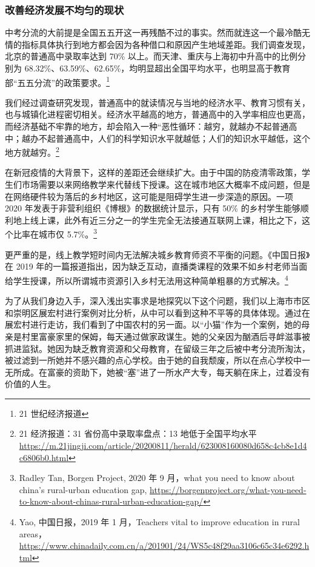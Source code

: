 \documentclass[12pt,UTF8]{ctexart}
\begin{document}
\subsubsection {改善经济发展不均匀的现状}
\par{中考分流的大前提是全国五五开这一再残酷不过的事实。然而就连这一个最冷酷无情的指标具体执行到地方都会因为各种借口和原因产生地域差距。我们调查发现，北京的普通高中录取率达到
	70\% 以上。而天津、重庆与上海初中升高中的比例分别为
	68.32\%、63.59\%、62.65\%，均明显超出全国平均水平，也明显高于教育部“五五分流”的政策要求。\footnote{21 世纪经济报道}}
\par{我们经过调查研究发现，普通高中的就读情况与当地的经济水平、教育习惯有关，也与城镇化进程密切相关。经济水平越高的地方，普通高中的入学率相应也更高，而经济基础不牢靠的地方，却会陷入一种“恶性循环：越穷，就越办不起普通高中；越办不起普通高中，人们的科学知识水平就越低；人们的知识水平越低，这个地方就越穷。\footnote{21
		经济报道：31 省份高中录取率盘点：13 地低于全国平均水平
		\url{https://m.21jingji.com/article/20200811/herald/623008160080d658c4cb8e1d4c6806b0.html}}}
\par{在新冠疫情的大背景下，这样的差距还会继续扩大。由于中国的防疫清零政策，学生们市场需要以来网络教学来代替线下授课。这在城市地区大概率不成问题，但是在网络硬件较为落后的乡村地区，这可能是阻碍学生进一步深造的原因。一项
	2020 年发表于非营利组织《博根》的数据统计显示，只有 50\%
	的乡村学生能够顺利地上线上课，此外有近三分之一的学生完全无法接通互联网上课，相比之下，这个比率在城市仅 5.7\%。\footnote{Radley Tan,
		Borgen Project, 2020 年 9 月，what you need to know about china's rural-urban
		education gap,
		\url{https://borgenproject.org/what-you-need-to-know-about-chinas-rural-urban-education-gap/}}}
\par{更严重的是，线上教学短时间内无法解决城乡教育师资不平衡的问题。《中国日报》在 2019
	年的一篇报道指出，因为缺乏互动，直播类课程的效果不如乡村老师当面给学生授课，所以所谓城市资源引入乡村无法用这种简单粗暴的方式解决。\footnote{Yao,
		中国日报，2019 年 1 月，Teachers vital to improve education in rural
		areas，\url{https://www.chinadaily.com.cn/a/201901/24/WS5c48f29aa3106c65c34e6292.html}}}
\par{为了从我们身边入手，深入浅出实事求是地探究以下这个问题，我们以上海市市区和崇明区展宏村进行案例对比分析，从中可以看到这种不平等的具体体现。通过在展宏村进行走访，我们看到了中国农村的另一面。以“小猫”作为一个案例，她的母亲是村里富豪家里的保姆，每天通过做家政谋生。她的父亲因为酗酒后寻衅滋事被抓进监狱。她因为缺乏教育资源和父母教育，在留级三年之后被中考分流所淘汰，被过滤到一所她并不感兴趣的点心学校。由于她的自我颓废，所以在点心学校中一无所成。在富豪的资助下，她被“塞”进了一所水产大专，每天躺在床上，过着没有价值的人生。}
\end{document}
